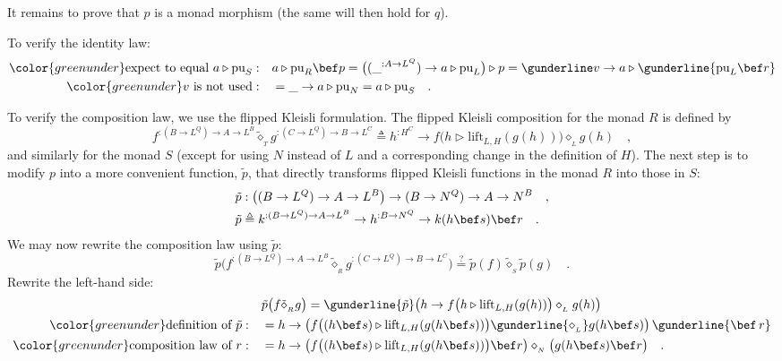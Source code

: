 It remains to prove that $p$ is a monad morphism (the same will then
hold for $q$).

To verify the identity law:
\begin{align*}
{\color{greenunder}\text{expect to equal }a\triangleright\text{pu}_{S}:}\quad & a\triangleright\text{pu}_{R}\bef p=\big((\_^{:A\rightarrow L^{Q}})\rightarrow a\triangleright\text{pu}_{L}\big)\triangleright p=\gunderline v\rightarrow a\triangleright\gunderline{\text{pu}_{L}\bef r}\\
{\color{greenunder}v\text{ is not used}:}\quad & =\_\rightarrow a\triangleright\text{pu}_{N}=a\triangleright\text{pu}_{S}\quad.
\end{align*}

To verify the composition law, we use the flipped Kleisli
formulation. The flipped Kleisli composition for the monad $R$ is
defined by
\[
f^{:(B\rightarrow L^{Q})\rightarrow A\rightarrow L^{B}}\tilde{\diamond}_{_{T}}g^{:(C\rightarrow L^{Q})\rightarrow B\rightarrow L^{C}}\triangleq h^{:H^{C}}\rightarrow f\big(h\triangleright\text{lift}_{L,H}(g(h))\big)\diamond_{_{L}}g(h)\quad,
\]
and similarly for the monad $S$ (except for using $N$ instead of
$L$ and a corresponding change in the definition of $H$). The next
step is to modify $p$ into a more convenient function, $\tilde{p}$,
that directly transforms flipped Kleisli functions in the monad $R$
into those in $S$:
\begin{align*}
 & \tilde{p}:\big((B\rightarrow L^{Q})\rightarrow A\rightarrow L^{B}\big)\rightarrow(B\rightarrow N^{Q})\rightarrow A\rightarrow N^{B}\quad,\\
 & \tilde{p}\triangleq k^{:(B\rightarrow L^{Q})\rightarrow A\rightarrow L^{B}}\rightarrow h^{:B\rightarrow N^{Q}}\rightarrow k(h\bef s)\bef r\quad.
\end{align*}
We may now rewrite the composition law using $\tilde{p}$:
\[
\tilde{p}\big(f^{:(B\rightarrow L^{Q})\rightarrow A\rightarrow L^{B}}\tilde{\diamond}_{_{R}}g^{:(C\rightarrow L^{Q})\rightarrow B\rightarrow L^{C}}\big)\overset{?}{=}\tilde{p}(f)\tilde{\diamond}_{_{S}}\tilde{p}(g)\quad.
\]
Rewrite the left-hand side:
\begin{align*}
 & \tilde{p}\big(f\tilde{\diamond}_{_{R}}g\big)=\gunderline{\tilde{p}}\big(h\rightarrow f\big(h\triangleright\text{lift}_{L,H}(g(h))\big)\diamond_{_{L}}g(h)\big)\\
{\color{greenunder}\text{definition of }\tilde{p}:}\quad & =h\rightarrow\big(f\big((h\bef s)\triangleright\text{lift}_{L,H}(g(h\bef s))\big)\gunderline{\diamond_{_{L}}}g(h\bef s)\big)\,\gunderline{\bef\,r}\\
{\color{greenunder}\text{composition law of }r:}\quad & =h\rightarrow\big(f\big((h\bef s)\triangleright\text{lift}_{L,H}(g(h\bef s))\big)\bef r\big)\diamond_{_{N}}\big(g(h\bef s)\bef r\big)\quad.
\end{align*}
